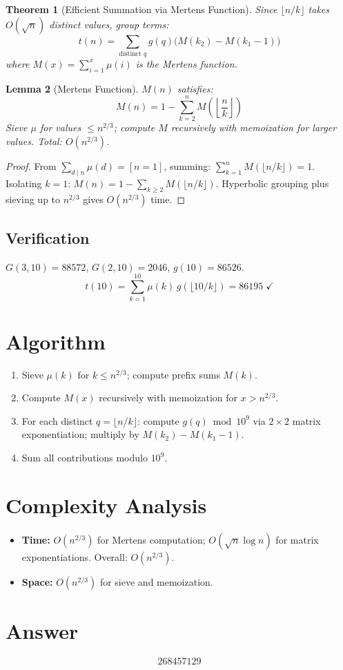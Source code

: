 \documentclass[12pt]{article}
\newtheorem{theorem}{Theorem}
\newtheorem{lemma}[theorem]{Lemma}
\begin{document}
\begin{theorem}[Efficient Summation via Mertens Function]
Since $\lfloor n/k \rfloor$ takes $O(\sqrt{n})$ distinct values, group terms:
\[
    t(n) = \sum_{\text{distinct }q} g(q)\bigl(M(k_2) - M(k_1-1)\bigr)
\]
where $M(x) = \sum_{i=1}^x \mu(i)$ is the Mertens function.
\end{theorem}

\begin{lemma}[Mertens Function]
$M(n)$ satisfies:
\[
    M(n) = 1 - \sum_{k=2}^{n} M\!\left(\!\left\lfloor\frac{n}{k}\right\rfloor\!\right)
\]
Sieve $\mu$ for values $\le n^{2/3}$; compute $M$ recursively with memoization for larger values. Total: $O(n^{2/3})$.
\end{lemma}

\begin{proof}
From $\sum_{d\mid n}\mu(d) = [n=1]$, summing: $\sum_{k=1}^n M(\lfloor n/k\rfloor) = 1$. Isolating $k=1$: $M(n) = 1 - \sum_{k\ge 2} M(\lfloor n/k\rfloor)$. Hyperbolic grouping plus sieving up to $n^{2/3}$ gives $O(n^{2/3})$ time.
\end{proof}

\subsection{Verification}

$G(3,10) = 88572$, $G(2,10) = 2046$, $g(10) = 86526$.
\[
    t(10) = \sum_{k=1}^{10}\mu(k)\,g(\lfloor 10/k\rfloor) = 86195 \;\checkmark
\]

\section{Algorithm}

\begin{enumerate}
    \item Sieve $\mu(k)$ for $k \le n^{2/3}$; compute prefix sums $M(k)$.
    \item Compute $M(x)$ recursively with memoization for $x > n^{2/3}$.
    \item For each distinct $q = \lfloor n/k \rfloor$: compute $g(q) \bmod 10^9$ via $2\times 2$ matrix exponentiation; multiply by $M(k_2) - M(k_1-1)$.
    \item Sum all contributions modulo $10^9$.
\end{enumerate}

\section{Complexity Analysis}

\begin{itemize}
    \item \textbf{Time:} $O(n^{2/3})$ for Mertens computation; $O(\sqrt{n}\log n)$ for matrix exponentiations. Overall: $O(n^{2/3})$.
    \item \textbf{Space:} $O(n^{2/3})$ for sieve and memoization.
\end{itemize}

\section{Answer}

\[
\boxed{268457129}
\]
\end{document}
